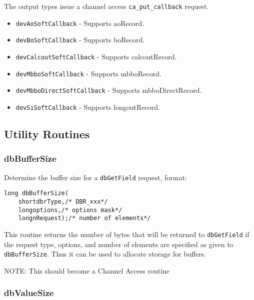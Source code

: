 The output types issue a channel access \verb|ca_put_callback| request.

\begin{itemize}

\item \verb|devAoSoftCallback| - Supports aoRecord.

\item \verb|devBoSoftCallback| - Supports boRecord.

\item \verb|devCalcoutSoftCallback| - Supports calcoutRecord.

\item \verb|devMbboSoftCallback| - Supports mbboRecord.

\item \verb|devMbboDirectSoftCallback| - Supports mbboDirectRecord.

\item \verb|devSiSoftCallback| - Supports longoutRecord.

\end{itemize}


\subsection{Utility Routines}

\subsubsection{dbBufferSize}

Determine the buffer size for a \verb|dbGetField| request, format:

\begin{verbatim}
long dbBufferSize(
    shortdbrType,/* DBR_xxx*/
    longoptions,/* options mask*/
    longnRequest);/* number of elements*/
\end{verbatim}

This routine returns the number of bytes that will be returned to \verb|dbGetField| if the request type, options, and number of elements are specified as given to \verb|dbBufferSize|.
Thus it can be used to allocate storage for buffers.

NOTE: This should become a Channel Access routine

\subsubsection{dbValueSize}

